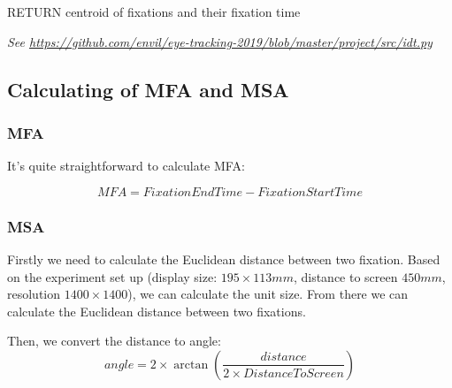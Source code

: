 \documentclass[sigchi-a]{acmart}
\begin{document}
RETURN centroid of fixations and their fixation time


\textit{See \url{https://github.com/envil/eye-tracking-2019/blob/master/project/src/idt.py}}   

\begin{marginfigure}
  
\end{marginfigure}

\subsection{Calculating of MFA and MSA}
\subsubsection{MFA}
It's quite straightforward to calculate MFA:

\begin{equation}
    MFA = FixationEndTime - FixationStartTime
\end{equation} 
\subsubsection{MSA} Firstly we need to calculate the Euclidean distance between two fixation. Based on the experiment set up (display size: $195\times113mm$, distance to screen $450mm$, resolution $1400\times1400$), we can calculate the unit size. From there we can calculate the Euclidean distance between two fixations.

Then, we convert the distance to angle:
\begin{equation}
    angle=2\times \arctan\left(\frac{distance}{2\times DistanceToScreen}\right)
\end{equation}


\end{document}
